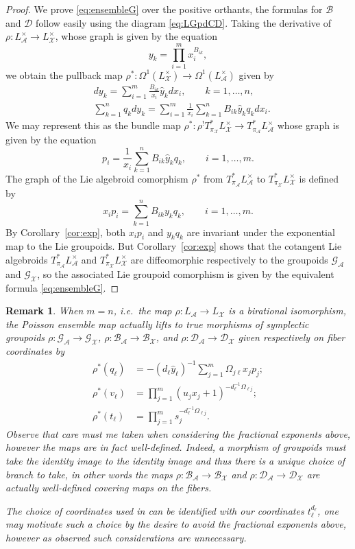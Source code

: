 \documentclass{amsart}
\newtheorem{remark}[theorem]{Remark}
\numberwithin{equation}{section}
\newcommand{\cA}{\mathcal{A}}
\newcommand{\cB}{\mathcal{B}}
\newcommand{\cD}{\mathcal{D}}
\newcommand{\cG}{\mathcal{G}}
\newcommand{\cX}{\mathcal{X}}
\begin{document}
\begin{proof}
  We prove \eqref{eq:ensembleG} over the positive orthants, the formulas for $\cB$ and $\cD$ follow easily using the diagram \eqref{eq:LGpdCD}.
  Taking the derivative of $\rho:L^\times_\cA\to L^\times_\cX$, whose graph is given by the equation
  \[y_k = \prod_{i=1}^m x_i^{B_{ik}},\]
  we obtain the pullback map $\rho^*: \Omega^1(L^\times_\cX) \to \Omega^1(L^\times_\cA)$ given by
  \begin{align*}
    & dy_k = \sum_{i=1}^m \frac{B_{ik}}{x_i} \hat{y}_k dx_i, \qquad k = 1, \ldots, n, \\
    & \sum_{k=1}^n q_k dy_k = \sum_{i=1}^m \frac{1}{x_i} \sum_{k=1}^n B_{ik} \hat{y}_k q_k dx_i.
  \end{align*}
  We may represent this as the bundle map $\rho^*:\rho^! T^*_{\pi_\cX} L^\times_\cX \to T^*_{\pi_\cA} L^\times_\cA$ whose graph is given by the equation
  \[p_i = \frac{1}{x_i} \sum_{k=1}^n B_{ik} \hat{y}_k q_k, \qquad i = 1, \ldots, m.\]
  The graph of the Lie algebroid comorphism $\rho^*$ from $T^*_{\pi_\cA} L^\times_\cA$ to $T^*_{\pi_\cX} L^\times_\cX$ is defined by
  \[x_i p_i =  \sum_{k=1}^n B_{ik} y_k q_k, \qquad i = 1, \ldots, m.\]
  By Corollary~\ref{cor:exp}, both $x_i p_i$ and $y_k q_k$ are invariant under the exponential map to the Lie groupoids.
  But Corollary~\ref{cor:exp} shows that the cotangent Lie algebroids $T^*_{\pi_\cA} L^\times_\cA$ and $T^*_{\pi_\cX} L^\times_\cX$ are diffeomorphic respectively to the groupoids $\cG_\cA$ and $\cG_\cX$, so the associated Lie groupoid comorphism is given by the equivalent formula \eqref{eq:ensembleG}.
\end{proof}

\begin{remark}
  \label{rmk:source-connected lift}
  When $m=n$, i.e.\ the map $\rho:L_\cA\to L_\cX$ is a birational isomorphism, the Poisson ensemble map actually lifts to true morphisms of symplectic groupoids $\rho:\cG_\cA\to\cG_\cX$, $\rho:\cB_\cA\to\cB_\cX$, and $\rho:\cD_\cA\to\cD_\cX$ given respectively on fiber coordinates by 
  \begin{align*}
    \rho^*(q_\ell)&=-(d_\ell\hat y_\ell)^{-1}\sum\limits_{j=1}^m\Omega_{j\ell}x_jp_j;\\
    \rho^*(v_\ell)&=\prod\limits_{j=1}^m (u_j x_j + 1)^{-d_\ell^{-1}\Omega_{\ell j}};\\
    \rho^*(t_\ell)&=\prod\limits_{j=1}^m s_j^{-d_\ell^{-1}\Omega_{\ell j}}.
  \end{align*}
  Observe that care must me taken when considering the fractional exponents above, however the maps are in fact well-defined.
  Indeed, a morphism of groupoids must take the identity image to the identity image and thus there is a unique choice of branch to take, in other words the maps $\rho:\cB_\cA\to\cB_\cX$ and $\rho:\cD_\cA\to\cD_\cX$ are actually well-defined covering maps on the fibers.

  The choice of coordinates used in \cite{FG09c} can be identified with our coordinates $t_\ell^{d_\ell}$, one may motivate such a choice by the desire to avoid the fractional exponents above, however as observed such considerations are unnecessary.
\end{remark}
\end{document}
